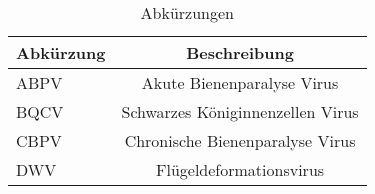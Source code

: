 \begin{table}
    \centering
    \caption{Abkürzungen}
    \label{tab:g:abkürzungen}
    \begin{tabular}{|l|c|}
        \hline
        Abkürzung   &   Beschreibung\\
        \hline
        ABPV            & Akute Bienenparalyse Virus\\
        BQCV            & Schwarzes Königinnenzellen Virus\\
        CBPV            & Chronische Bienenparalyse Virus\\
        DWV             & Flügeldeformationsvirus\\
        \hline
    \end{tabular}
\end{table}